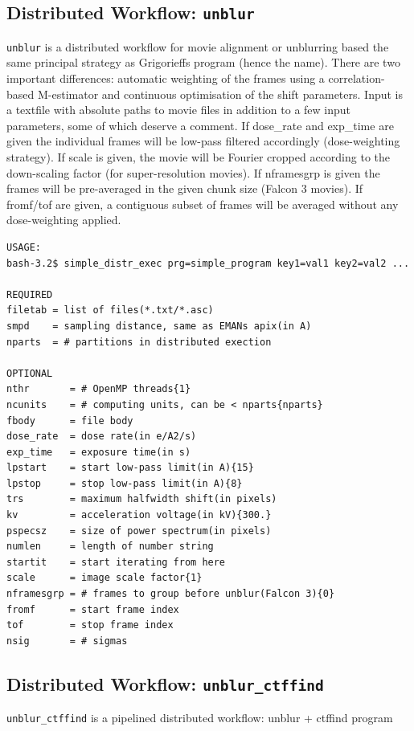 \documentclass[a4paper,11pt]{article}
\newcommand{\prgname}[1]{\textcolor{NavyBlue}{\texttt{#1}}}
\begin{document}
\subsection{Distributed Workflow: \prgname{unblur}}
\label{unblur}
\prgname{unblur} is a distributed workflow for movie alignment or unblurring based the same principal strategy as Grigorieffs program (hence the name). There are two important differences: automatic weighting of the frames using a correlation-based M-estimator and continuous optimisation of the shift parameters. Input is a textfile with absolute paths to movie files in addition to a few input parameters, some of which deserve a comment. If dose\_rate and exp\_time are given the individual frames will be low-pass filtered accordingly (dose-weighting strategy). If scale is given, the movie will be Fourier cropped according to the down-scaling factor (for super-resolution movies). If nframesgrp is given the frames will be pre-averaged in the given chunk size (Falcon 3 movies). If fromf/tof are given, a contiguous subset of frames will be averaged without any dose-weighting applied. 

\begin{verbatim}
USAGE:
bash-3.2$ simple_distr_exec prg=simple_program key1=val1 key2=val2 ...

REQUIRED
filetab = list of files(*.txt/*.asc)
smpd    = sampling distance, same as EMANs apix(in A)
nparts  = # partitions in distributed exection

OPTIONAL
nthr       = # OpenMP threads{1}
ncunits    = # computing units, can be < nparts{nparts}
fbody      = file body
dose_rate  = dose rate(in e/A2/s)
exp_time   = exposure time(in s)
lpstart    = start low-pass limit(in A){15}
lpstop     = stop low-pass limit(in A){8}
trs        = maximum halfwidth shift(in pixels)
kv         = acceleration voltage(in kV){300.}
pspecsz    = size of power spectrum(in pixels)
numlen     = length of number string
startit    = start iterating from here
scale      = image scale factor{1}
nframesgrp = # frames to group before unblur(Falcon 3){0}
fromf      = start frame index
tof        = stop frame index
nsig       = # sigmas
\end{verbatim}

\subsection{Distributed Workflow: \prgname{unblur\_ctffind}}
\label{unblur_ctffind}
\prgname{unblur\_ctffind} is a pipelined distributed workflow: unblur + ctffind program
\end{document}
